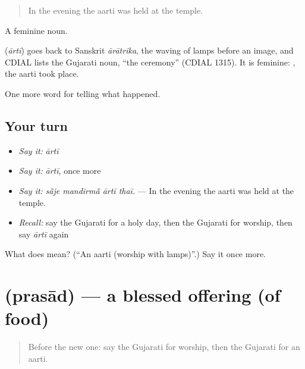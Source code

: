 \begin{quote}
In the evening the aarti was held at the temple.
\end{quote}

A feminine noun.

\begin{cousinweb}
\textbf{} (\emph{ārtī}) goes back to Sanskrit \emph{ārātrika}, the waving of lamps before an image, and CDIAL lists the Gujarati noun, \textquotedblleft{}the ceremony\textquotedblright{} (CDIAL 1315). It is feminine: \textbf{ }, the aarti took place.
\end{cousinweb}

\begin{grammarlens}[title={What you've built}]
One more word for telling what happened.
\end{grammarlens}

\subsection*{Your turn}
\begin{itemize}
\raggedright
  \item \emph{Say it:} \emph{ārtī}
  \item \emph{Say it:} \emph{ārtī}, once more
  \item \emph{Say it:} \emph{sā̃je mandirmā̃ ārtī thaī.} — In the evening the aarti was held at the temple.
  \item \emph{Recall:} say the Gujarati for a holy day, then the Gujarati for worship, then say \emph{ārtī} again
\end{itemize}

\begin{tcolorbox}[breakable,colback=teal!4,colframe=teal!35!black,title={Before you move on}]
What does  mean? (\textquotedblleft{}An aarti (worship with lamps)\textquotedblright{}.) Say it once more.
\end{tcolorbox}
\section[\texorpdfstring{\gu{પ્રસાદ} (prasād)}{પ્રસાદ (prasād)}]{ (prasād) — a blessed offering (of food)}

\label{lesson:GU-C328-prasad}



\begin{quote}
Before the new one: say the Gujarati for worship, then the Gujarati for an aarti.
\end{quote}

